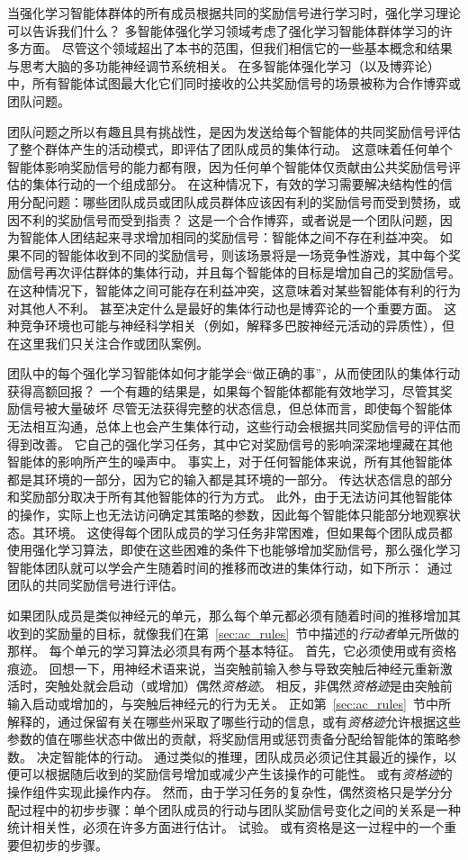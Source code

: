 当强化学习智能体群体的所有成员根据共同的奖励信号进行学习时，强化学习理论可以告诉我们什么？
多智能体强化学习领域考虑了强化学习智能体群体学习的许多方面。
尽管这个领域超出了本书的范围，但我们相信它的一些基本概念和结果与思考大脑的多功能神经调节系统相关。
在多智能体强化学习（以及博弈论）中，所有智能体试图最大化它们同时接收的公共奖励信号的场景被称为合作博弈或团队问题。


团队问题之所以有趣且具有挑战性，是因为发送给每个智能体的共同奖励信号评估了整个群体产生的活动模式，即评估了团队成员的集体行动。
这意味着任何单个智能体影响奖励信号的能力都有限，因为任何单个智能体仅贡献由公共奖励信号评估的集体行动的一个组成部分。
在这种情况下，有效的学习需要解决结构性的信用分配问题：哪些团队成员或团队成员群体应该因有利的奖励信号而受到赞扬，或因不利的奖励信号而受到指责？
这是一个合作博弈，或者说是一个团队问题，因为智能体人团结起来寻求增加相同的奖励信号：智能体之间不存在利益冲突。
如果不同的智能体收到不同的奖励信号，则该场景将是一场竞争性游戏，其中每个奖励信号再次评估群体的集体行动，并且每个智能体的目标是增加自己的奖励信号。
在这种情况下，智能体之间可能存在利益冲突，这意味着对某些智能体有利的行为对其他人不利。
甚至决定什么是最好的集体行动也是博弈论的一个重要方面。
这种竞争环境也可能与神经科学相关（例如，解释多巴胺神经元活动的异质性），但在这里我们只关注合作或团队案例。


团队中的每个强化学习智能体如何才能学会“做正确的事”，从而使团队的集体行动获得高额回报？
一个有趣的结果是，如果每个智能体都能有效地学习，尽管其奖励信号被大量破坏 尽管无法获得完整的状态信息，但总体而言，即使每个智能体无法相互沟通，总体上也会产生集体行动，这些行动会根据共同奖励信号的评估而得到改善。
它自己的强化学习任务，其中它对奖励信号的影响深深地埋藏在其他智能体的影响所产生的噪声中。
事实上，对于任何智能体来说，所有其他智能体都是其环境的一部分，因为它的输入都是其环境的一部分。
传达状态信息的部分和奖励部分取决于所有其他智能体的行为方式。
此外，由于无法访问其他智能体的操作，实际上也无法访问确定其策略的参数，因此每个智能体只能部分地观察状态。其环境。
这使得每个团队成员的学习任务非常困难，但如果每个团队成员都使用强化学习算法，即使在这些困难的条件下也能够增加奖励信号，那么强化学习智能体团队就可以学会产生随着时间的推移而改进的集体行动，如下所示： 通过团队的共同奖励信号进行评估。


如果团队成员是类似神经元的单元，那么每个单元都必须有随着时间的推移增加其收到的奖励量的目标，就像我们在第~\ref{sec:ac_rules}~节中描述的\textit{行动者}单元所做的那样。
每个单元的学习算法必须具有两个基本特征。
首先，它必须使用或有资格痕迹。
回想一下，用神经术语来说，当突触前输入参与导致突触后神经元重新激活时，突触处就会启动（或增加）偶然\textit{资格迹}。
相反，非偶然\textit{资格迹}是由突触前输入启动或增加的，与突触后神经元的行为无关。
正如第~\ref{sec:ac_rules}~节中所解释的，通过保留有关在哪些州采取了哪些行动的信息，或有\textit{资格迹}允许根据这些参数的值在哪些状态中做出的贡献，将奖励信用或惩罚责备分配给智能体的策略参数。
决定智能体的行动。
通过类似的推理，团队成员必须记住其最近的操作，以便可以根据随后收到的奖励信号增加或减少产生该操作的可能性。
或有\textit{资格迹}的操作组件实现此操作内存。
然而，由于学习任务的复杂性，偶然资格只是学分分配过程中的初步步骤：单个团队成员的行动与团队奖励信号变化之间的关系是一种统计相关性，必须在许多方面进行估计。
试验。
或有资格是这一过程中的一个重要但初步的步骤。



